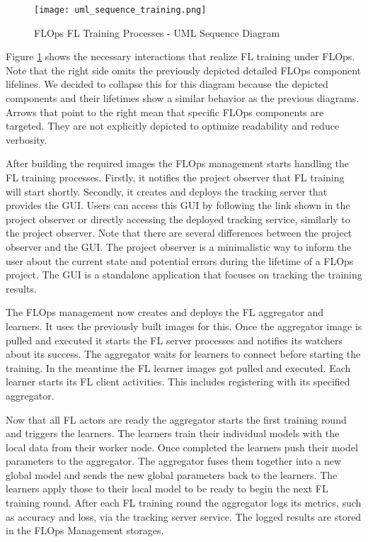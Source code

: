\begin{figure}[h]
    \begin{adjustwidth}{-0.2\paperwidth}{-0.2\paperwidth}
        \centering
        \texttt{[image: uml\_sequence\_training.png]}
        \caption{FLOps FL Training Processes - UML Sequence Diagram}
        \label{fig:uml_sequence_training}
    \end{adjustwidth}
\end{figure}

Figure \ref{fig:uml_sequence_training} shows the necessary interactions that realize FL training under FLOps.
Note that the right side omits the previously depicted detailed FLOps component lifelines.
We decided to collapse this for this diagram because the depicted components and their lifetimes show a similar behavior as the previous diagrams.
Arrows that point to the right mean that specific FLOps components are targeted.
They are not explicitly depicted to optimize readability and reduce verbosity.

After building the required images the FLOps management starts handling the FL training processes.
Firstly, it notifies the project observer that FL training will start shortly.
Secondly, it creates and deploys the tracking server that provides the GUI.
Users can access this GUI by following the link shown in the project observer or directly accessing the deployed tracking service, similarly to the project observer.
Note that there are several differences between the project observer and the GUI.
The project observer is a minimalistic way to inform the user about the current state and potential errors during the lifetime of a FLOps project.
The GUI is a standalone application that focuses on tracking the training results.

The FLOps management now creates and deploys the FL aggregator and learners.
It uses the previously built images for this.
Once the aggregator image is pulled and executed it starts the FL server processes and notifies its watchers about its success.
The aggregator waits for learners to connect before starting the training.
In the meantime the FL learner images got pulled and executed.
Each learner starts its FL client activities.
This includes registering with its specified aggregator.

Now that all FL actors are ready the aggregator starts the first training round and triggers the learners.
The learners train their individual models with the local data from their worker node.
Once completed the learners push their model parameters to the aggregator.
The aggregator fuses them together into a new global model and sends the new global parameters back to the learners.
The learners apply those to their local model to be ready to begin the next FL training round.
After each FL training round the aggregator logs its metrics, such as accuracy and loss, via the tracking server service.
The logged results are stored in the FLOps Management storages.

